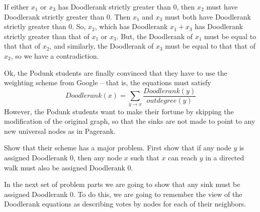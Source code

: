 \documentclass[twoside,12pt]{article}
\begin{document}
\begin{problem}[25 points]
{If either $x_1$ or $x_3$ has Doodlerank strictly greater than 0,
then $x_2$ must have  Doodlerank strictly greater than 0.  Then
$x_1$ and $x_3$ must both have Doodlerank strictly greater than 0.
So, $x_2$, which has Doodlerank $x_1+x_3$ has Doodlerank strictly
greater than that of $x_1$ or $x_3$. But, the Doodlerank of $x_1$
must be equal to that that of $x_2$, and similarly, the Doodlerank
of $x_3$ must be equal to that that of $x_2$, so we have a
contradiction. }


\ppart Ok,  the Podunk students are finally convinced that they have
to use the weighting scheme from Google -- that is, the equations
must satisfy
$$Doodlerank(x) = \sum_{y \rightarrow x} \frac{Doodlerank(y)}{outdegree(y)}$$
However, the Podunk students want to make their fortune by skipping
the modification of the original graph, so that the sinks are not
made to point to any new universal nodes as in Pagerank.

Show that their scheme has a major problem. First show that if any
node $y$ is assigned Doodlerank 0, then any node $x$ such that $x$
can reach $y$ in a directed walk must also be assigned Doodlerank
$0$.


\ppart In the next set of problem parts we are going to show that
any sink must be assigned Doodlerank 0. To do this, we are going to
remember the view of the Doodlerank equations as describing votes by
nodes for each of their neighbors.

\begin{enumerate}


\end{enumerate}
\end{problem}
\end{document}

